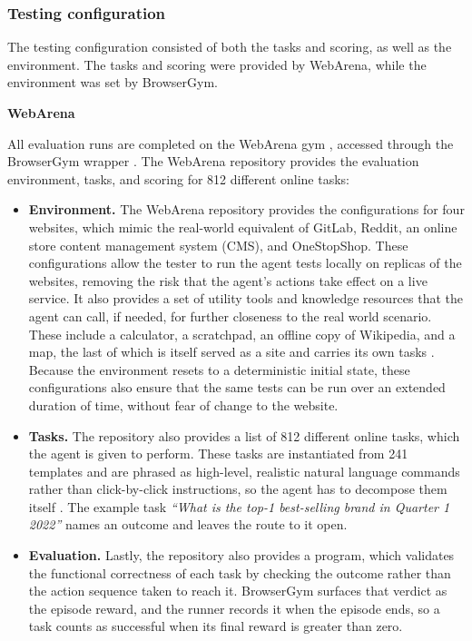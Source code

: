 \subsubsection{Testing configuration}
The testing configuration consisted of both the tasks and scoring, as well as the environment. The tasks and scoring were provided by WebArena, while the environment was set by BrowserGym.

\textbf{WebArena}

All evaluation runs are completed on the WebArena gym \citep{zhou2024webarena},
accessed through the BrowserGym wrapper \citep{dechezelles2024browsergym}. The
WebArena repository provides the evaluation environment, tasks, and scoring for
812 different online tasks:

\begin{itemize}
    \item \textbf{Environment.} The WebArena repository provides the
    configurations for four websites, which mimic the real-world equivalent of
    GitLab, Reddit, an online store content management system (CMS), and
    OneStopShop. These configurations allow the tester to run the agent tests
    locally on replicas of the websites, removing the risk that the agent's
    actions take effect on a live service. It also provides a set of utility
    tools and knowledge resources that the agent can call, if needed, for
    further closeness to the real world scenario. These include a calculator, a
    scratchpad, an offline copy of Wikipedia, and a map, the last of which is
    itself served as a site and carries its own tasks \citep{zhou2024webarena}.
    Because the environment resets to a deterministic initial state, these
    configurations also ensure that the same tests can be run over an extended
    duration of time, without fear of change to the website.

    \item \textbf{Tasks.} The repository also provides a list of 812 different
    online tasks, which the agent is given to perform. These tasks are
    instantiated from 241 templates and are phrased as high-level, realistic
    natural language commands rather than click-by-click instructions, so the
    agent has to decompose them itself \citep{zhou2024webarena}. The example
    task \textit{``What is the top-1 best-selling brand in Quarter 1 2022''}
    names an outcome and leaves the route to it open.

    \item \textbf{Evaluation.} Lastly, the repository also provides a program,
    which validates the functional correctness of each task by checking the
    outcome rather than the action sequence taken to reach it. BrowserGym
    surfaces that verdict as the episode reward, and the runner records it when
    the episode ends, so a task counts as successful when its final reward is
    greater than zero.
\end{itemize}

